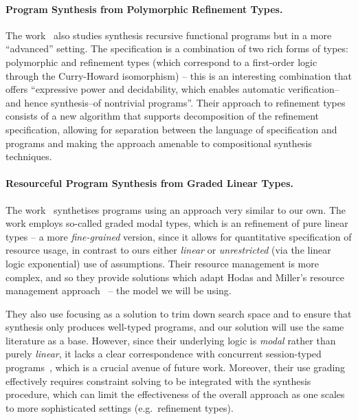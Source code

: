\documentclass{llncs}
\newcommand{\mypara}[1]{\paragraph{\textbf{#1}.}}
\begin{document}
  
\mypara{Program Synthesis from Polymorphic Refinement Types} The
work~\cite{DBLP:conf/pldi/PolikarpovaKS16} also studies synthesis
recursive functional programs but in a more ``advanced'' setting. The
specification is a combination of two rich forms of types: polymorphic and
refinement types (which correspond to a first-order logic through the
Curry-Howard isomorphism) -- this is an interesting combination that offers
``expressive power and decidability, which enables automatic
verification--and hence synthesis--of nontrivial programs''.  Their
approach to refinement types consists of a new algorithm that supports
decomposition of the refinement specification, allowing for separation
between the language of specification and programs and making the
approach amenable to compositional synthesis techniques.

\mypara{Resourceful Program Synthesis from Graded Linear Types} The
work~\cite{DBLP:conf/lopstr/HughesO20} synthetises programs using an
approach very similar to our own.  The work employs so-called graded
modal types, which is an refinement of pure linear types -- a more
\emph{fine-grained} version, since it allows for quantitative
specification of resource usage, in contrast to ours either
\emph{linear} or \emph{unrestricted} (via the linear logic
exponential) use of assumptions.  Their resource management is more
complex, and so they provide solutions which adapt Hodas and Miller's
resource management
approach~\cite{DBLP:journals/tcs/CervesatoHP00,DBLP:journals/tcs/LiangM09}
-- the model we will be using.

They also use focusing as a solution to trim down search space and to
ensure that synthesis only produces well-typed programs, and our
solution will use the same literature as a base.  However, since their
underlying logic is \emph{modal} rather than purely \emph{linear}, it
lacks a clear correspondence with concurrent session-typed
programs~\cite{DBLP:journals/mscs/CairesPT16,DBLP:conf/concur/CairesP10},
which is a crucial avenue of future work. Moreover, their use grading
effectively requires constraint solving to be integrated with the
synthesis procedure, which can limit the effectiveness of the overall
approach as one scales to more sophisticated settings (e.g.~refinement
types).

\end{document}

